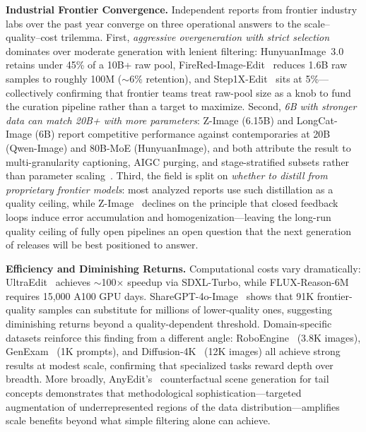 \documentclass{llmxive}
\begin{document}
\textbf{Industrial Frontier Convergence.}
Independent reports from frontier industry labs over the past year converge on three operational answers to the scale--quality--cost trilemma. First, \emph{aggressive overgeneration with strict selection} dominates over moderate generation with lenient filtering: HunyuanImage~3.0~\citep{cao2025hunyuanimage} retains under 45\% of a 10B+ raw pool, FireRed-Image-Edit~\citep{team2026firered} reduces 1.6B raw samples to roughly 100M ($\sim$6\% retention), and Step1X-Edit~\citep{liu2025step1x} sits at 5\%---collectively confirming that frontier teams treat raw-pool size as a knob to fund the curation pipeline rather than a target to maximize. Second, \emph{6B with stronger data can match 20B+ with more parameters}: Z-Image (6.15B) and LongCat-Image (6B) report competitive performance against contemporaries at 20B (Qwen-Image) and 80B-MoE (HunyuanImage), and both attribute the result to multi-granularity captioning, AIGC purging, and stage-stratified subsets rather than parameter scaling~\citep{cai2025z,team2025longcat}. Third, the field is split on \emph{whether to distill from proprietary frontier models}: most analyzed reports use such distillation as a quality ceiling, while Z-Image~\citep{cai2025z} declines on the principle that closed feedback loops induce error accumulation and homogenization---leaving the long-run quality ceiling of fully open pipelines an open question that the next generation of releases will be best positioned to answer.

\textbf{Efficiency and Diminishing Returns.}
Computational costs vary dramatically: UltraEdit~\citep{zhao2024ultraedit} achieves $\sim$100$\times$ speedup via SDXL-Turbo, while FLUX-Reason-6M~\citep{fang2025flux} requires 15,000 A100 GPU days. ShareGPT-4o-Image~\citep{chen2025sharegpt} shows that 91K frontier-quality samples can substitute for millions of lower-quality ones, suggesting diminishing returns beyond a quality-dependent threshold. Domain-specific datasets reinforce this finding from a different angle: RoboEngine~\citep{yuan2025roboengine} (3.8K images), GenExam~\citep{wang2025genexam} (1K prompts), and Diffusion-4K~\citep{zhang2025diffusion} (12K images) all achieve strong results at modest scale, confirming that specialized tasks reward depth over breadth. More broadly, AnyEdit's~\citep{yu2025anyedit} counterfactual scene generation for tail concepts demonstrates that methodological sophistication---targeted augmentation of underrepresented regions of the data distribution---amplifies scale benefits beyond what simple filtering alone can achieve.
\end{document}
